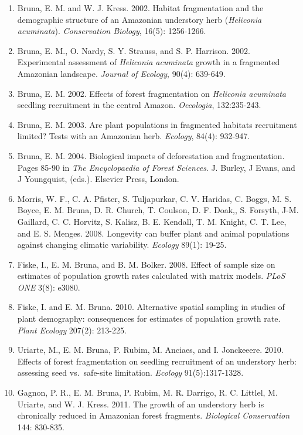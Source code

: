 \documentclass[
  12pt,
  man, donotrepeattitle]{apa6}
\begin{document}
\begin{enumerate}
\def\labelenumi{\arabic{enumi}.}
\item
  Bruna, E. M. and W. J. Kress. 2002. Habitat fragmentation and the demographic structure of an Amazonian understory herb (\emph{Heliconia acuminata}). \emph{Conservation Biology}, 16(5): 1256-1266.
\item
  Bruna, E. M., O. Nardy, S. Y. Strauss, and S. P. Harrison. 2002. Experimental assessment of \emph{Heliconia acuminata} growth in a fragmented Amazonian landscape. \emph{Journal of Ecology}, 90(4): 639-649.
\item
  Bruna, E. M. 2002. Effects of forest fragmentation on \emph{Heliconia acuminata} seedling recruitment in the central Amazon. \emph{Oecologia}, 132:235-243.
\item
  Bruna, E. M. 2003. Are plant populations in fragmented habitats recruitment limited? Tests with an Amazonian herb. \emph{Ecology}, 84(4): 932-947.
\item
  Bruna, E. M. 2004. Biological impacts of deforestation and fragmentation. Pages 85-90 in \emph{The Encyclopaedia of Forest Sciences}. J. Burley, J Evans, and J Youngquist, (eds.). Elsevier Press, London.
\item
  Morris, W. F., C. A. Pfister, S. Tuljapurkar, C. V. Haridas, C. Boggs, M. S. Boyce, E. M. Bruna, D. R. Church, T. Coulson, D. F. Doak,, S. Forsyth, J-M. Gaillard, C. C. Horvitz, S. Kalisz, B. E. Kendall, T. M. Knight, C. T. Lee, and E. S. Menges. 2008. Longevity can buffer plant and animal populations against changing climatic variability. \emph{Ecology} 89(1): 19-25.
\item
  Fiske, I., E. M. Bruna, and B. M. Bolker. 2008. Effect of sample size on estimates of population growth rates calculated with matrix models. \emph{PLoS ONE} 3(8): e3080.
\item
  Fiske, I. and E. M. Bruna. 2010. Alternative spatial sampling in studies of plant demography: consequences for estimates of population growth rate. \emph{Plant Ecology} 207(2): 213-225.
\item
  Uriarte, M., E. M. Bruna, P. Rubim, M. Anciaes, and I. Jonckeeere. 2010. Effects of forest fragmentation on seedling recruitment of an understory herb: assessing seed vs.~safe-site limitation. \emph{Ecology} 91(5):1317-1328.
\item
  Gagnon, P. R., E. M. Bruna, P. Rubim, M. R. Darrigo, R. C. Littlel, M. Uriarte, and W. J. Kress. 2011. The growth of an understory herb is chronically reduced in Amazonian forest fragments. \emph{Biological Conservation} 144: 830-835.

\end{enumerate}
\end{document}
